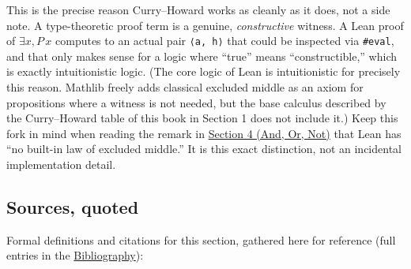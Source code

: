This is the precise reason Curry--Howard works as cleanly as it does, not a side note. A type-theoretic proof term is a genuine, \emph{constructive} witness. A Lean proof of \(\exists x, P\, x\) computes to an actual pair \texttt{⟨a, h⟩} that could be inspected via \texttt{\#eval}, and that only makes sense for a logic where ``true'' means ``constructible,'' which is exactly intuitionistic logic. (The core logic of Lean is intuitionistic for precisely this reason. Mathlib freely adds classical excluded middle as an axiom for propositions where a witness is not needed, but the base calculus described by the Curry--Howard table of this book in Section 1 does not include it.) Keep this fork in mind when reading the remark in \hyperref[sec:04-propositions-and-proofs:05-and-or-not:1]{Section 4 (And, Or, Not)} that Lean has ``no built-in law of excluded middle.'' It is this exact distinction, not an incidental implementation detail.

\subsection{Sources, quoted}\label{sec:04-propositions-and-proofs:02-logic-recap:8}

Formal definitions and citations for this section, gathered here for reference (full entries in the \hyperref[sec:root:bibliography:1]{Bibliography}):

